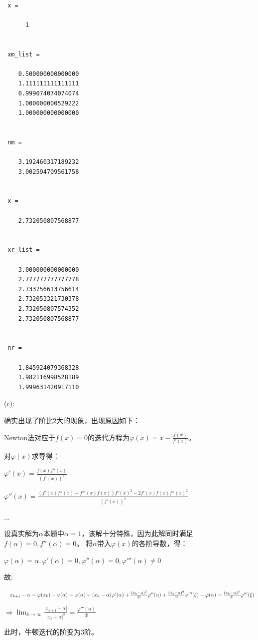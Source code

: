 \documentclass[12pt,a4paper,utf8]{ctexart}
\begin{document}
\begin{enumerate}
\begin{lstlisting}[frame=single]
 
 x =
 
      1
 
 
 xm_list =
 
    0.500000000000000
    1.111111111111111
    0.999074074074074
    1.000000000529222
    1.000000000000000
 
 
 nm =
 
    3.192460317189232
    3.002594709561758
 
 
 x =
 
    2.732050807568877
 
 
 xr_list =
 
    3.000000000000000
    2.777777777777778
    2.733756613756614
    2.732053321730378
    2.732050807574352
    2.732050807568877
 
 
 nr =
 
    1.845924079368328
    1.982116998528189
    1.999631420917110
\end{lstlisting}

(c):

确实出现了阶比2大的现象，出现原因如下：

Newton法对应于$f(x)=0$的迭代方程为$\varphi (x)=x-\frac{f(x)}{f'(x)}$。

对$\varphi (x)$求导得：

$\varphi' (x)=\frac{f(x)f''(x)}{(f'(x))^2}$

$\varphi'' (x)=\frac{(f'(x)f''(x)+f'''(x)f(x))f'(x)^2-2f'(x)f(x)f''(x)^2}{(f'(x))^4}$

...

设真实解为$\alpha$本题中$\alpha=1$，该解十分特殊，因为此解同时满足$f(\alpha)=0,f''(\alpha)=0$。
将$\alpha$带入$\varphi (x)$的各阶导数，得：

$\varphi (\alpha)=\alpha,\varphi' (\alpha)=0,\varphi'' (\alpha)=0,\varphi''' (\alpha)\neq 0$

故:

$\quad x_{k+1}-\alpha \\
= \varphi (x_k)-\varphi (\alpha)\\
=\varphi (\alpha)+(x_k-\alpha)\varphi' (\alpha)+\frac{(x_k-\alpha)^2}{2!}\varphi'' (\alpha)+\frac{(x_k-\alpha)^3}{3!}\varphi''' (\xi )-\varphi (\alpha) \\
=\frac{(x_k-\alpha)^3}{3!}\varphi''' (\xi )$

$\Rightarrow \lim_{k \to \infty} \frac{|x_{k+1}-\alpha |}{|x_k-\alpha |^3}=\frac{\varphi''' (\alpha)}{3!} $

此时，牛顿迭代的阶变为3阶。


\end{enumerate}
\end{document}

